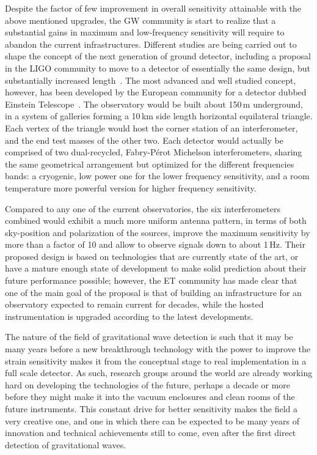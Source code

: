 Despite the factor of few improvement in overall sensitivity attainable with the above mentioned upgrades, the GW community is start to realize that a substantial gains in maximum and low-frequency sensitivity will require to abandon the current infrastructures. 
Different studies are being carried out to shape the concept of the next generation of ground detector, including a proposal in the LIGO community to move to a detector of essentially the same design, but substantially increased length~\cite{Dwyer2015}. The most advanced and well studied concept, however, has been developed by the European community for a detector dubbed Einstein Telescope~\cite{Punturo2010}.
The observatory would be built about 150\,m underground, in a system of galleries forming a 10\,km side length horizontal equilateral triangle. Each vertex of the triangle would host the corner station of an interferometer, and the end test masses of the other two. 
Each detector would actually be comprised of two dual-recycled, Fabry-P\'{e}rot Michelson  interferometers, sharing the same geometrical arrangement but optimized for the different frequencies bands: a cryogenic, low power one for the lower frequency sensitivity, and a room temperature more powerful version for higher frequency sensitivity.

Compared to any one of the current observatories, the six interferometers combined would exhibit a much more uniform antenna pattern, in terms of both sky-position and polarization of the sources, improve the maximum sensitivity by more than a factor of 10 and allow to observe signals down to about 1\,Hz. 
Their proposed design is based on technologies that are currently state of the art, or have a mature enough state of development to make solid prediction about their future performance possible; however, the ET community has made clear that one of the main goal of the proposal is that of building an infrastructure for an observatory expected to remain current for decades, while the hosted instrumentation is upgraded according to the latest developments.

The nature of the field of gravitational wave detection is such that it may be many years before a new breakthrough technology with the power to improve the strain sensitivity makes it from the conceptual stage to real implementation in a full scale detector. 
As such, research groups around the world are already working hard on developing the technologies of the future, perhaps a decade or more before they might make it into the vacuum enclosures and clean rooms of the future instruments. 
This constant drive for better sensitivity makes the field a very creative one, and one in which there can be expected to be many years of innovation and technical achievements still to come, even after the first direct detection of gravitational waves.